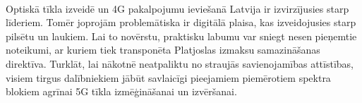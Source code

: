 \paragraph{}
Optiskā tīkla izveidē un 4G pakalpojumu ieviešanā Latvija ir izvirzījusies starp
līderiem. Tomēr joprojām problemātiska ir digitālā plaisa, kas izveidojusies starp
pilsētu un laukiem. Lai to novērstu, praktisku labumu var sniegt nesen pieņemtie
noteikumi, ar kuriem tiek transponēta Platjoslas izmaksu samazināšanas direktīva.
Turklāt, lai nākotnē neatpaliktu no straujās savienojamības attīstības, visiem tirgus
dalībniekiem jābūt savlaicīgi pieejamiem piemērotiem spektra blokiem agrīnai 5G
tīkla izmēģināšanai un izvēršanai.
